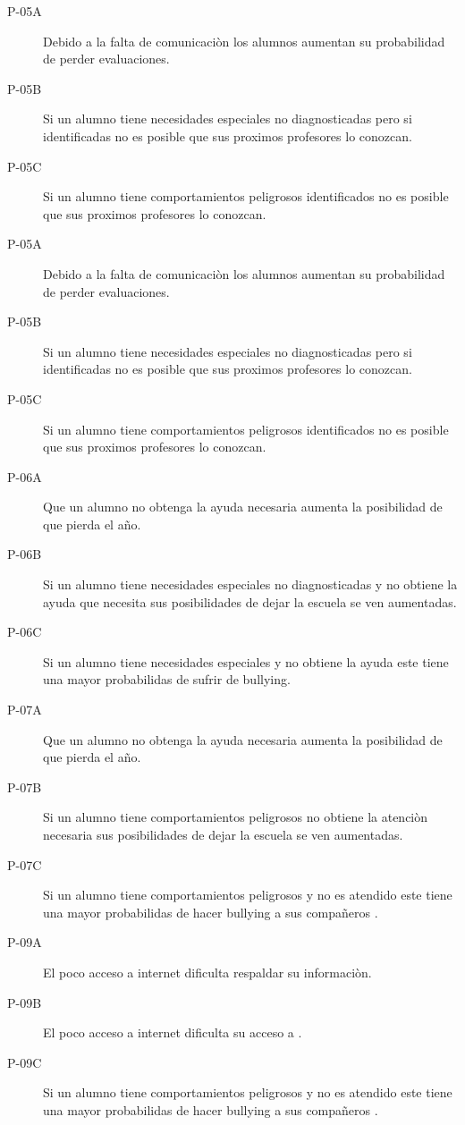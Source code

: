 \begin{description}
    \item[P-05A] Debido a la falta de comunicaciòn los alumnos aumentan su probabilidad de perder evaluaciones.
	\item[P-05B] Si un alumno tiene necesidades especiales no diagnosticadas pero si identificadas no es posible que sus proximos profesores lo conozcan.
    \item[P-05C] Si un alumno tiene comportamientos peligrosos identificados no es posible que sus proximos profesores lo conozcan.
    \item[P-05A] Debido a la falta de comunicaciòn los alumnos aumentan su probabilidad de perder evaluaciones.
	\item[P-05B] Si un alumno tiene necesidades especiales no diagnosticadas pero si identificadas no es posible que sus proximos profesores lo conozcan.
    \item[P-05C] Si un alumno tiene comportamientos peligrosos identificados no es posible que sus proximos profesores lo conozcan.
    \item[P-06A] Que un alumno no obtenga la ayuda necesaria aumenta la posibilidad de que pierda el año.
	\item[P-06B] Si un alumno tiene necesidades especiales no diagnosticadas y no obtiene la ayuda que necesita sus posibilidades de dejar la escuela se ven aumentadas.
    \item[P-06C] Si un alumno tiene necesidades especiales y no obtiene la ayuda este tiene una mayor probabilidas de sufrir de bullying.
    \item[P-07A] Que un alumno no obtenga la ayuda necesaria aumenta la posibilidad de que pierda el año.
	\item[P-07B] Si un alumno tiene comportamientos peligrosos no obtiene la atenciòn necesaria sus posibilidades de dejar la escuela se ven aumentadas.
    \item[P-07C] Si un alumno tiene comportamientos peligrosos y no es atendido este tiene una mayor probabilidas de hacer bullying a sus compañeros .
    \item[P-09A] El poco acceso a internet dificulta respaldar su informaciòn.
	\item[P-09B] El poco acceso a internet dificulta su acceso a .
    \item[P-09C] Si un alumno tiene comportamientos peligrosos y no es atendido este tiene una mayor probabilidas de hacer bullying a sus compañeros .
\end{description}
 
